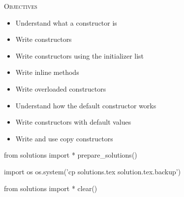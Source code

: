 
\textsc{Objectives}
\begin{itemize}
\item Understand what a constructor is
\item Write constructors
\item Write constructors using the initializer list
\item Write inline methods
\item Write overloaded constructors
\item Understand how the default constructor works
\item Write constructors with default values
\item Write and use copy constructors
\end{itemize}



















\begin{python0}
from solutions import *
prepare_solutions()
\end{python0}
\begin{python}
import os
os.system('cp solutions.tex solution.tex.backup')  
\end{python}

\begin{python0}
from solutions import *
clear()
\end{python0}

